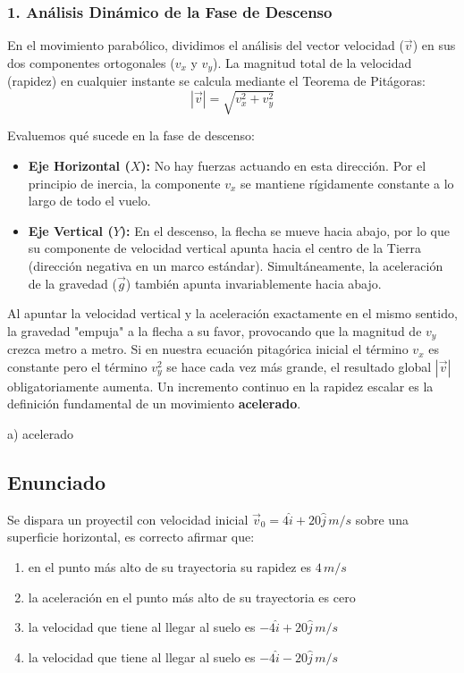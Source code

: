\documentclass[12pt, a4paper]{article}
\begin{document}
\subsubsection*{1. Análisis Dinámico de la Fase de Descenso}
En el movimiento parabólico, dividimos el análisis del vector velocidad ($\vec{v}$) en sus dos componentes ortogonales ($v_x$ y $v_y$).
La magnitud total de la velocidad (rapidez) en cualquier instante se calcula mediante el Teorema de Pitágoras:
$$ |\vec{v}| = \sqrt{v_x^2 + v_y^2} $$

Evaluemos qué sucede en la fase de descenso:
\begin{itemize}
    \item \textbf{Eje Horizontal ($X$):} No hay fuerzas actuando en esta dirección. Por el principio de inercia, la componente $v_x$ se mantiene rígidamente constante a lo largo de todo el vuelo.
    \item \textbf{Eje Vertical ($Y$):} En el descenso, la flecha se mueve hacia abajo, por lo que su componente de velocidad vertical apunta hacia el centro de la Tierra (dirección negativa en un marco estándar). Simultáneamente, la aceleración de la gravedad ($\vec{g}$) también apunta invariablemente hacia abajo.
\end{itemize}

Al apuntar la velocidad vertical y la aceleración exactamente en el mismo sentido, la gravedad "empuja" a la flecha a su favor, provocando que la magnitud de $v_y$ crezca metro a metro. 
Si en nuestra ecuación pitagórica inicial el término $v_x$ es constante pero el término $v_y^2$ se hace cada vez más grande, el resultado global $|\vec{v}|$ obligatoriamente aumenta. Un incremento continuo en la rapidez escalar es la definición fundamental de un movimiento \textbf{acelerado}.

\begin{tcolorbox}[colback=green!5!white, colframe=green!50!black, title=Respuesta Final]
\centering \Large a) acelerado
\end{tcolorbox}

\newpage

\subsection*{Enunciado}
Se dispara un proyectil con velocidad inicial $\vec{v}_0 = 4\hat{i} + 20\hat{j} \,\si{m/s}$ sobre una superficie horizontal, es correcto afirmar que:
\begin{enumerate}[label=\alph*)]
    \item en el punto más alto de su trayectoria su rapidez es $4\,\si{m/s}$
    \item la aceleración en el punto más alto de su trayectoria es cero
    \item la velocidad que tiene al llegar al suelo es $-4\hat{i} + 20\hat{j} \,\si{m/s}$
    \item la velocidad que tiene al llegar al suelo es $-4\hat{i} - 20\hat{j} \,\si{m/s}$
\end{enumerate}
\end{document}
